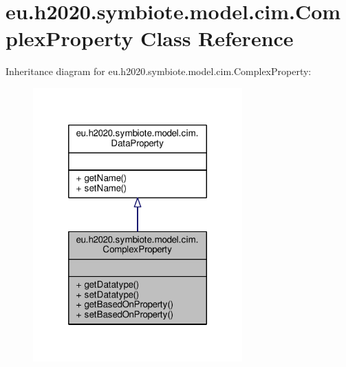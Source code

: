 \hypertarget{classeu_1_1h2020_1_1symbiote_1_1model_1_1cim_1_1ComplexProperty}{}\section{eu.\+h2020.\+symbiote.\+model.\+cim.\+Complex\+Property Class Reference}
\label{classeu_1_1h2020_1_1symbiote_1_1model_1_1cim_1_1ComplexProperty}


Inheritance diagram for eu.\+h2020.\+symbiote.\+model.\+cim.\+Complex\+Property\+:
\nopagebreak
\begin{figure}[H]
\begin{center}
\leavevmode
\includegraphics[width=228pt]{classeu_1_1h2020_1_1symbiote_1_1model_1_1cim_1_1ComplexProperty__inherit__graph}
\end{center}
\end{figure}



